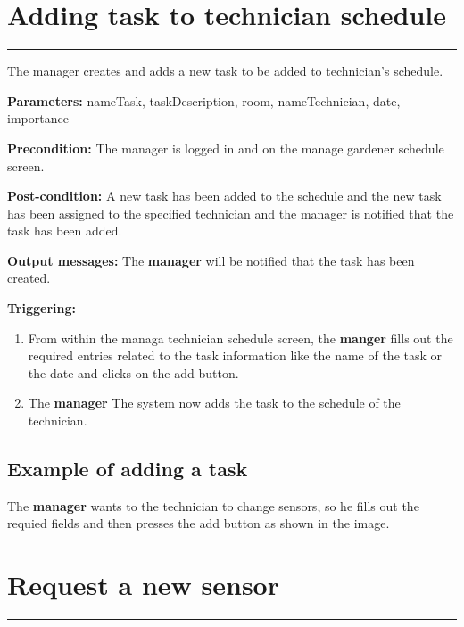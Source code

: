 \section{Adding task to technician schedule}

\hrule
\hfill
\vspace{0.5cm}
\label{operation:addTaskTechnichian}

The manager creates and adds a new task to be added to technician's schedule.
\begin{description}

\item \textbf{Parameters:} nameTask, taskDescription, room, nameTechnician,
date, importance
\item \textbf{Precondition:} The manager is logged in and on the manage gardener
schedule screen.
\item \textbf{Post-condition:} A new task has been added to the schedule and the
new task has been assigned to the specified technician and the manager is
notified that the task has been added.
\item \textbf{Output messages:} The \textbf{manager} will be notified that the
task has been created.

\item \textbf{Triggering:}
\begin{enumerate}
\item From within the managa technician schedule screen, the \textbf{manger}
fills out the required entries related to the task information like the name of the task or
the date and clicks on the add button.
\item The \textbf{manager} The system now adds the task to the schedule of the
technician.
\end{enumerate}
\end{description}
\subsection{Example of adding a task}
The \textbf{manager} wants to the technician to change sensors, so he fills out
the requied fields and then presses the add button as shown in the image.



\section{Request a new sensor}

\hrule
\hfill
\vspace{0.5cm}
\label{operation:Request a new sensor}

